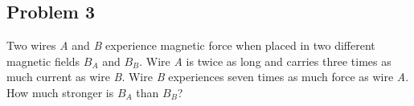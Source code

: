 \documentclass{article}
\begin{document}
	\subsection{Problem 3}
	Two wires \textit{A} and \textit{B} experience magnetic force when placed in two different magnetic fields $B_A$ and $B_B$. Wire \textit{A} is twice as long and carries three times as much current as wire \textit{B}. Wire \textit{B} experiences seven times as much force as wire \textit{A}. How much stronger is $B_A$ than $B_B$?
	
	
	
	
	
\end{document}
